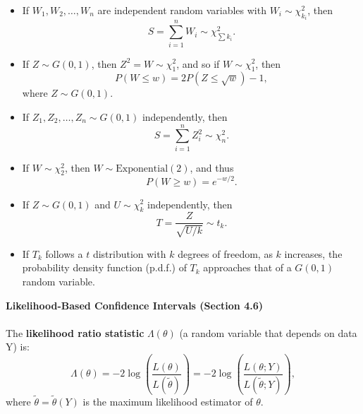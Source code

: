 \documentclass[a4paper,12pt]{article}
\begin{document}
\begin{itemize}
    \item If $W_1, W_2, \ldots, W_n$ are independent random variables with $W_i \sim \chi^2_{k_i}$, then 
    \[
    S = \sum_{i=1}^{n} W_i \sim \chi^2_{\sum k_i}.
    \]

    \item If $Z \sim G(0, 1)$, then $Z^2 = W \sim \chi^2_1$, and so if $W \sim \chi^2_1$, then 
    \[
    P(W \leq w) = 2P(Z \leq \sqrt{w}) - 1, 
    \]
    where $Z \sim G(0, 1)$.

    \item If $Z_1, Z_2, \ldots, Z_n \sim G(0, 1)$ independently, then 
    \[
    S = \sum_{i=1}^{n} Z_i^2 \sim \chi^2_n.
    \]

    \item If $W \sim \chi^2_2$, then $W \sim \text{Exponential}(2)$, and thus
    \[
    P(W \geq w) = e^{-w/2}.
    \]

    \item If $Z \sim G(0, 1)$ and $U \sim \chi^2_k$ independently, then 
    \[
    T = \frac{Z}{\sqrt{U/k}} \sim t_k.
    \]

    \item If $T_k$ follows a $t$ distribution with $k$ degrees of freedom, as $k$ increases, the probability density function (p.d.f.) of $T_k$ approaches that of a $G(0, 1)$ random variable.
\end{itemize}
\textbf{Likelihood-Based Confidence Intervals (Section 4.6)}
\\
\\ The \textbf{likelihood ratio statistic} \( \Lambda(\theta) \) (a random variable that depends on data Y) is:
\[
\Lambda(\theta) = -2 \log \left( \frac{L(\theta)}{L(\tilde{\theta})} \right)
= -2 \log \left( \frac{L(\theta; Y)}{L(\tilde{\theta}; Y)} \right),
\]
where \( \tilde{\theta} = \tilde{\theta}(Y) \) is the maximum likelihood estimator of \( \theta \).
\end{document}
